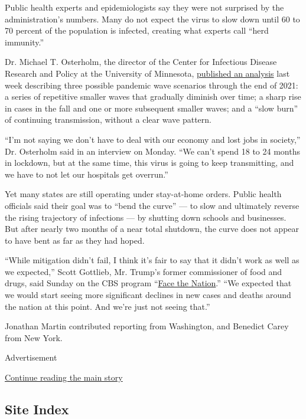 Public health experts and epidemiologists say they were not surprised by
the administration's numbers. Many do not expect the virus to slow down
until 60 to 70 percent of the population is infected, creating what
experts call ``herd immunity.''

Dr. Michael T. Osterholm, the director of the Center for Infectious
Disease Research and Policy at the University of Minnesota,
\href{https://www.cidrap.umn.edu/sites/default/files/public/downloads/cidrap-covid19-viewpoint-part1_0.pdf}{published
an analysis} last week describing three possible pandemic wave scenarios
through the end of 2021: a series of repetitive smaller waves that
gradually diminish over time; a sharp rise in cases in the fall and one
or more subsequent smaller waves; and a ``slow burn'' of continuing
transmission, without a clear wave pattern.

``I'm not saying we don't have to deal with our economy and lost jobs in
society,'' Dr. Osterholm said in an interview on Monday. ``We can't
spend 18 to 24 months in lockdown, but at the same time, this virus is
going to keep transmitting, and we have to not let our hospitals get
overrun.''

Yet many states are still operating under stay-at-home orders. Public
health officials said their goal was to ``bend the curve'' --- to slow
and ultimately reverse the rising trajectory of infections --- by
shutting down schools and businesses. But after nearly two months of a
near total shutdown, the curve does not appear to have bent as far as
they had hoped.

``While mitigation didn't fail, I think it's fair to say that it didn't
work as well as we expected,'' Scott Gottlieb, Mr. Trump's former
commissioner of food and drugs, said Sunday on the CBS program
``\href{https://www.cbsnews.com/news/transcript-scott-gottlieb-discusses-coronavirus-on-face-the-nation-may-3-2020/}{Face
the Nation}.'' ``We expected that we would start seeing more significant
declines in new cases and deaths around the nation at this point. And
we're just not seeing that.''

Jonathan Martin contributed reporting from Washington, and Benedict
Carey from New York.

Advertisement

\protect\hyperlink{after-bottom}{Continue reading the main story}

\hypertarget{site-index}{%
\subsection{Site Index}\label{site-index}}

